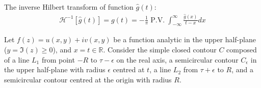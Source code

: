 \documentclass[12pt, english]{book}
\makeatletter
\renewenvironment{proof}[1][\proofname]{\par
	\pushQED{\qed}%
	\normalfont \topsep6\p@\@plus6\p@\relax
	\list{}{%
		\settowidth{\leftmargin}{\itshape\proofname:\hskip\labelsep}%
		\setlength{\labelwidth}{0pt}%
		\setlength{\itemindent}{-\leftmargin}%
		}%
	\item[\hskip\labelsep\itshape#1\@addpunct{:}]\ignorespaces
	}{\popQED\endlist\@endpefalse}
\makeatother
\begin{document}
	\begin{theorem}
		\label{Inverse Hilbert Transform Theorem - Complex}
		The inverse Hilbert transform of function \(\hat{g}(t)\):
		\begin{align*}
			\mathcal{H}^{-1}[\hat{g}(t)] = g(t)
			= - \frac{1}{\pi} \operatorname{P.V.} \int_{-\infty}^{\infty} \frac{\hat{g}(x)}{t-x} dx 
		\end{align*}
	\end{theorem}
	\begin{proof}
		Let \(f(z) = u(x,y) + iv(x,y)\) be a function analytic in the upper half-plane (\(y = \Im(z) \geq 0 \)), and \(x = t \in \mathbb{R}\). Consider the simple closed contour \(C\) composed of a line \(L_1\) from point \(-R\) to \(\tau-\epsilon\) on the real axis, a semicircular contour \(C_\epsilon\) in the upper half-plane with radius \(\epsilon\) centred at \(t\), a line \(L_2\) from \(\tau+\epsilon\) to \(R\), and a semicircular contour centred at the origin with radius \(R\).
		

\end{proof}
\end{document}
